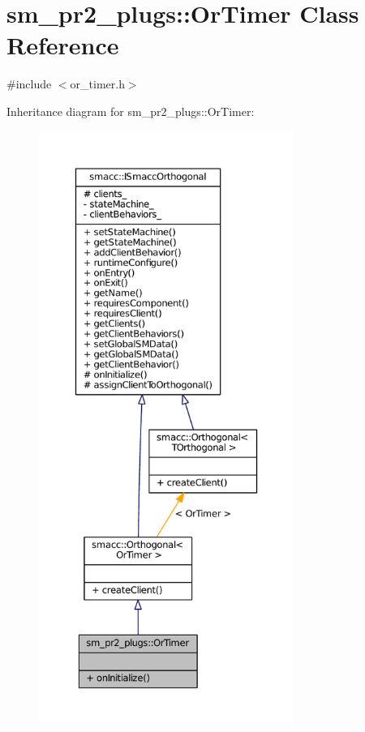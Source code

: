 \hypertarget{classsm__pr2__plugs_1_1OrTimer}{}\section{sm\+\_\+pr2\+\_\+plugs\+:\+:Or\+Timer Class Reference}
\label{classsm__pr2__plugs_1_1OrTimer}


{\ttfamily \#include $<$or\+\_\+timer.\+h$>$}



Inheritance diagram for sm\+\_\+pr2\+\_\+plugs\+:\+:Or\+Timer\+:
\nopagebreak
\begin{figure}[H]
\begin{center}
\leavevmode
\includegraphics[height=550pt]{classsm__pr2__plugs_1_1OrTimer__inherit__graph}
\end{center}
\end{figure}


